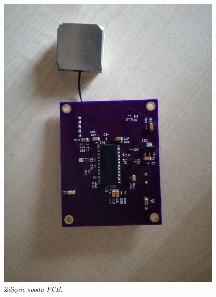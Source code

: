 \documentclass[eng,printmode]{mgr}
\begin{document}
\begin{center}\centering
\begin{figure}[!h]
\vskip 1cm
    \centering
    \includegraphics[width=\textwidth]{images/bottomPcb.jpg}
    \caption{\textit{\scriptsize Zdjęcie spodu PCB.}}
\end{figure}
\end{center}
\end{document}

